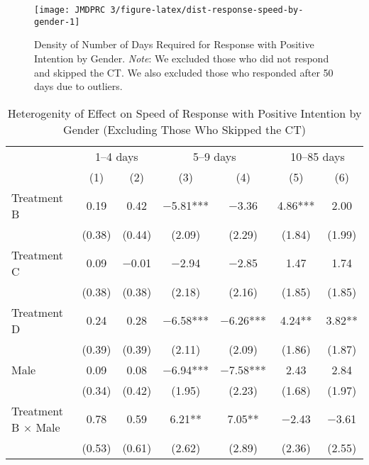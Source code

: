 \documentclass[12pt, a4paper]{article}
\begin{document}
\begin{figure}[t]
\texttt{[image: JMDPRC~3/figure-latex/dist-response-speed-by-gender-1]} \caption{Density of Number of Days Required for Response with Positive Intention by Gender. \newline \emph{Note}: We excluded those who did not respond and skipped the CT. We also excluded those who responded after 50 days due to outliers.}\label{fig:dist-response-speed-by-gender}
\end{figure}

\begin{table}[H]

\caption{\label{tab:lm-interaction-gender-int-time-decompose-noskip}Heterogenity of Effect on Speed of Response with Positive Intention by Gender (Excluding Those Who Skipped the CT)}
\centering
\fontsize{8}{10}\selectfont
\begin{threeparttable}
\begin{tabular}[t]{lcccccc}
\toprule
\multicolumn{1}{c}{ } & \multicolumn{2}{c}{1--4 days} & \multicolumn{2}{c}{5--9 days} & \multicolumn{2}{c}{10--85 days} \\
\cmidrule(l{3pt}r{3pt}){2-3} \cmidrule(l{3pt}r{3pt}){4-5} \cmidrule(l{3pt}r{3pt}){6-7}
  & (1) & (2) & (3) & (4) & (5) & (6)\\
\midrule
Treatment B & \num{0.19} & \num{0.42} & \num{-5.81}*** & \num{-3.36} & \num{4.86}*** & \num{2.00}\\
 & (\num{0.38}) & (\num{0.44}) & (\num{2.09}) & (\num{2.29}) & (\num{1.84}) & (\num{1.99})\\
Treatment C & \num{0.09} & \num{-0.01} & \num{-2.94} & \num{-2.85} & \num{1.47} & \num{1.74}\\
 & (\num{0.38}) & (\num{0.38}) & (\num{2.18}) & (\num{2.16}) & (\num{1.85}) & (\num{1.85})\\
Treatment D & \num{0.24} & \num{0.28} & \num{-6.58}*** & \num{-6.26}*** & \num{4.24}** & \num{3.82}**\\
 & (\num{0.39}) & (\num{0.39}) & (\num{2.11}) & (\num{2.09}) & (\num{1.86}) & (\num{1.87})\\
Male & \num{0.09} & \num{0.08} & \num{-6.94}*** & \num{-7.58}*** & \num{2.43} & \num{2.84}\\
 & (\num{0.34}) & (\num{0.42}) & (\num{1.95}) & (\num{2.23}) & (\num{1.68}) & (\num{1.97})\\
Treatment B $\times$ Male & \num{0.78} & \num{0.59} & \num{6.21}** & \num{7.05}** & \num{-2.43} & \num{-3.61}\\
 & (\num{0.53}) & (\num{0.61}) & (\num{2.62}) & (\num{2.89}) & (\num{2.36}) & (\num{2.55})\\

\end{tabular}
\end{threeparttable}
\end{table}
\end{document}
